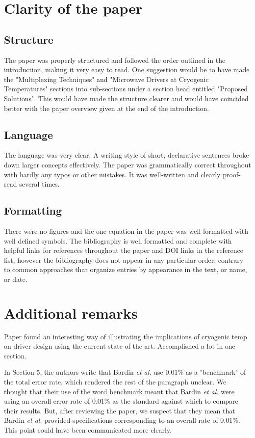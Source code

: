 \documentclass[11pt]{article}
\begin{document}
\section{Clarity of the paper}
\label{sec:orgd9b6e0d}

\subsection{Structure}
\label{sec:org38a86f9}
The paper was properly structured and followed the order outlined in
the introduction, making it very easy to read. One suggestion would be
to have made the "Multiplexing Techniques" and "Microwave Drivers at
Cryogenic Temperatures" sections into sub-sections under a section
head entitled "Proposed Solutions". This would have made the structure
clearer and would have coincided better with the paper overview given
at the end of the introduction.

\subsection{Language}
\label{sec:orge30959e}
The language was very clear. A writing style of short, declarative
sentences broke down larger concepts effectively. The paper was
grammatically correct throughout with hardly any typos or other
mistakes. It was well-written and clearly proof-read several times.

\subsection{Formatting}
\label{sec:org94cb047}
There were no figures and the one equation in the paper was
well formatted with well defined symbols. The bibliography is well
formatted and complete with helpful links for references throughout
the paper and DOI links in the reference list, however the
bibliography does not appear in any particular order, contrary to
common approaches that organize entries by appearance in the text, or
name, or date.

\section{Additional remarks}
\label{sec:org6656e70}
Paper found an interesting way of illustrating the implications of
cryogenic temp on driver design using the current state of the art.
Accomplished a lot in one section.

In Section 5, the authors write that Bardin \emph{et al.} use 0.01\% as a
"benchmark" of the total error rate, which rendered the rest of the
paragraph unclear. We thought that their use of the word benchmark
meant that Bardin \emph{et al.} were using an overall error rate of 0.01\% as
the standard against which to compare their results. But, after
reviewing the paper, we suspect that they mean that Bardin \emph{et al.}
provided specifications corresponding to an overall rate of 0.01\%.
This point could have been communicated more clearly.
\end{document}
